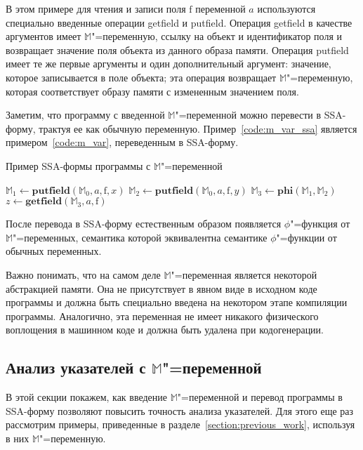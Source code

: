\documentclass[14pt,titlepage,draft]{extarticle}
\newcommand{\M}{\ensuremath{\mathbb{M}}}
\let\mathphi\phi
\renewcommand{\phi}{\ensuremath{\mathphi}}
\newcommand{\field}[1]{\mathrm{#1}}
\newcommand{\op}[1]{\mathbf{#1}}
\begin{document}
      В этом примере для чтения и записи поля $\field{f}$ переменной $a$
      используются специально введенные операции getfield и putfield. Операция
      getfield в качестве аргументов имеет \M"=переменную, ссылку на объект и
      идентификатор поля и возвращает значение поля объекта из данного
      образа памяти. Операция putfield имеет те же первые аргументы и один
      дополнительный аргумент: значение, которое записывается в поле объекта;
      эта операция возвращает \M"=переменную, которая соответствует образу
      памяти с измененным значением поля.

      Заметим, что программу с введенной \M"=переменной можно перевести в
      SSA-форму, трактуя ее как обычную переменную. Пример~\ref{code:m_var_ssa}
      является примером~\ref{code:m_var}, переведенным в SSA-форму.

      \begin{algorithm}
        \caption{Пример SSA-формы программы с \M"=переменной}
        \label{code:m_var_ssa}
        \begin{algorithmic}[1]
          \If{\ldots}
            \State $\M_1 \gets \op{putfield}(\M_0, a, \field{f}, x)$
          \Else
            \State $\M_2 \gets \op{putfield}(\M_0, a, \field{f}, y)$
          \EndIf
          \State $\M_3 \gets \op{phi}(\M_1, \M_2)$
          \State $z \gets \op{getfield}(\M_3, a, \field{f})$
        \end{algorithmic}
      \end{algorithm}

      После перевода в SSA-форму естественным образом появляется \phi"=функция
      от \M"=переменных, семантика которой эквивалентна семантике \phi"=функции
      от обычных переменных.

      Важно понимать, что на самом деле \M"=переменная является некоторой
      абстракцией памяти. Она не присутствует в явном виде в исходном коде
      программы и должна быть специально введена на некотором этапе компиляции
      программы. Аналогично, эта переменная не имеет никакого физического
      воплощения в машинном коде и должна быть удалена при кодогенерации.

    \subsection{Анализ указателей с \texorpdfstring{\M}{M}"=переменной}

      В этой секции покажем, как введение \M"=переменной и перевод программы в
      SSA-форму позволяют повысить точность анализа указателей. Для этого еще
      раз рассмотрим примеры, приведенные в
      разделе~\ref{section:previous_work}, используя в них \M"=переменную.
\end{document}
